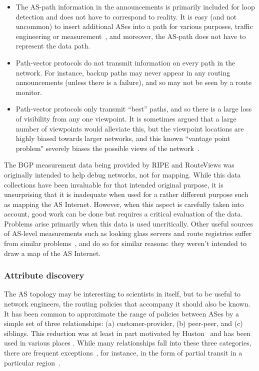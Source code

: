 \begin{itemize}

\item The AS-path information in the announcements is primarily
included for loop detection and does not have to correspond to
reality. It is easy (and not uncommon) to insert additional ASes into 
a path for various purposes, \eg traffic engineering or
measurement~\cite{colitti06:_poison,bush09:_inter_optom}, and
moreover, the AS-path does not have to represent the data path.

\item Path-vector protocols do not transmit information on every path 
in the network. For instance, backup paths may never appear in any 
routing announcements (unless there is a failure), and so may not be 
seen by a route monitor.

\item Path-vector protocols only transmit ``best'' paths, and so there 
is a large loss of visibility from any one viewpoint. It is sometimes 
argued that a large number of viewpoints would
alleviate this, but the viewpoint locations are highly biased
towards larger networks, and this known ``vantage point problem" 
severely biases the possible views of the network~\cite{roughan08:_bigfoot}. 

\end{itemize}

The BGP measurement data being provided by RIPE and RouteViews was originally 
intended to help debug networks, not for mapping. While this data collections 
have been invaluable for that intended original purpose, it is unsurprising 
that it is inadequate when used for a rather different purpose such as mapping 
the AS Internet. However, when this aspect is carefully taken into account, 
good work can be done but requires a critical evaluation of the data.  Problems 
arise primarily when this data is used uncritically.  Other useful sources of 
AS-level measurements such as looking glass servers and route registries suffer 
from similar problems~\cite{Mahadevan06,he07}, and do so for similar reasons: 
they weren't intended to draw a map of the AS Internet.

\subsubsection{Attribute discovery}

The AS topology may be interesting to scientists in itself, but to be useful 
to network engineers, the routing policies that accompany it should also be known.  
It has been common to approximate the range of policies between ASes by a simple 
set of three relationships: (a) customer-provider, (b) peer-peer, and (c) siblings.  
This reduction was at least in part motivated by Huston~\cite{huston99:_peering_i,huston99:_peering_ii} and has been used in various places
\cite{subramanian02:_charac_inter,wang03:_infer,xia04:_as}.  While many 
relationships fall into these three categories, there are frequent exceptions~\cite{hyun03:_tracer_and_bgp,muehlbauer06:_build_as,Qiu07}, for instance, in the form 
of partial transit in a particular region~\cite{maz:partial-transit,norton1}.

